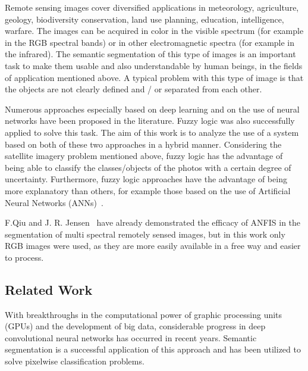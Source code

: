 \documentclass[10pt,twocolumn,letterpaper]{article}
\begin{document}
Remote sensing images cover diversified applications in meteorology, agriculture, geology, biodiversity conservation, land use planning, education, intelligence, warfare. The images can be acquired in color in the visible spectrum (for example in the RGB spectral bands) or in other electromagnetic spectra (for example in the infrared). The semantic segmentation of this type of images is an important task to make them usable and also understandable by human beings, in the fields of application mentioned above. A typical problem with this type of image is that the objects are not clearly defined and / or separated from each other.

Numerous approaches especially based on deep learning and on the use of neural networks have been proposed in the literature. Fuzzy logic was also successfully applied to solve this task.
The aim of this work is to analyze the use of a system based on both of these two approaches in a hybrid manner. Considering the satellite imagery problem mentioned above, fuzzy logic has the advantage of being able to classify the classes/objects of the photos with a certain degree of uncertainty. Furthermore, fuzzy logic approaches have the advantage of being more explanatory than others, for example those based on the use of Artificial Neural Networks (ANNs)~\cite{QiuJenenr}.

F.Qiu and J. R. Jensen~\cite{QiuJenenr} have already demonstrated the efficacy of ANFIS in the segmentation of multi spectral remotely sensed images, but in this work only RGB images were used, as they are more easily available in a free way and easier to process.

\subsection{Related Work}

With breakthroughs in the computational power of graphic processing units (GPUs) and the development of big data, considerable progress in deep convolutional neural networks has occurred in recent years. Semantic segmentation is a successful application of this approach and has been utilized to solve pixelwise classification problems.
\end{document}
